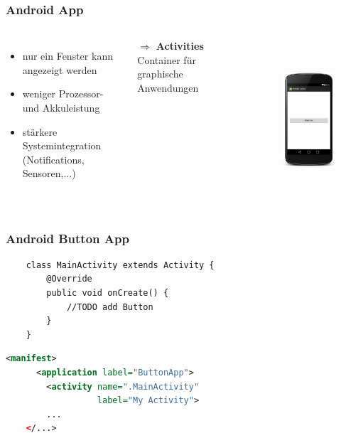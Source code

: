 \begin{frame}[c]
	\frametitle{Android App}
	\begin{columns}[t]
	\begin{itemize}
	\item nur ein Fenster kann angezeigt werden \pause
	\item weniger Prozessor- und Akkuleistung \pause
	\item stärkere Systemintegration \\ (Notifications, Sensoren,...) \pause
	\end{itemize}
	\vspace{0.2cm}
	$\Rightarrow$ \textbf{Activities} \pause \\
	\hspace{1cm}Container für graphische Anwendungen \pause

	\vspace{-1cm}
	\begin{figure}
	\includegraphics[height=6cm]{pictures/button-android-framed.png}
	\end{figure}
	\end{columns}
\end{frame}

\begin{frame}[c,fragile]
	\frametitle{Android Button App}
	\begin{lstlisting}
	class MainActivity extends Activity {
	    @Override
	    public void onCreate() {
	        //TODO add Button
	    }
	}
	\end{lstlisting}
	\pause \vspace{0.5cm}
	\begin{lstlisting}[language=XML]
	<manifest>
	  <application label="ButtonApp">
	    <activity name=".MainActivity" 
	              label="My Activity">
        ...
	</...>
	\end{lstlisting}
\end{frame}

